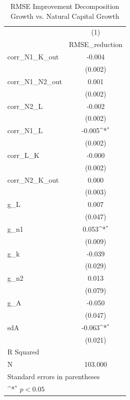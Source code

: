 \begin{table}[htbp]\centering
\def\sym#1{\ifmmode^{#1}\else\(^{#1}\)\fi}
\caption{RMSE Improvement Decomposition Growth vs. Natural Capital Growth}
\begin{tabular}{l*{1}{c}}
\hline\hline
            &\multicolumn{1}{c}{(1)}\\
            &\multicolumn{1}{c}{RMSE\_reduction}\\
\hline
corr\_N1\_K\_out&      -0.004       \\
            &     (0.002)       \\
[1em]
corr\_N1\_N2\_out&       0.001       \\
            &     (0.002)       \\
[1em]
corr\_N2\_L   &      -0.002       \\
            &     (0.002)       \\
[1em]
corr\_N1\_L   &      -0.005\sym{*}\\
            &     (0.002)       \\
[1em]
corr\_L\_K    &      -0.000       \\
            &     (0.002)       \\
[1em]
corr\_N2\_K\_out&       0.000       \\
            &     (0.003)       \\
[1em]
g\_L         &       0.007       \\
            &     (0.047)       \\
[1em]
g\_n1        &       0.053\sym{*}\\
            &     (0.009)       \\
[1em]
g\_k         &      -0.039       \\
            &     (0.029)       \\
[1em]
g\_n2        &       0.013       \\
            &     (0.079)       \\
[1em]
g\_A         &      -0.050       \\
            &     (0.047)       \\
[1em]
sdA         &      -0.063\sym{*}\\
            &     (0.021)       \\
\hline
R Squared   &                   \\
N           &     103.000       \\
\hline\hline
\multicolumn{2}{l}{\footnotesize Standard errors in parentheses}\\
\multicolumn{2}{l}{\footnotesize \sym{*} \(p<0.05\)}\\
\end{tabular}
\end{table}
